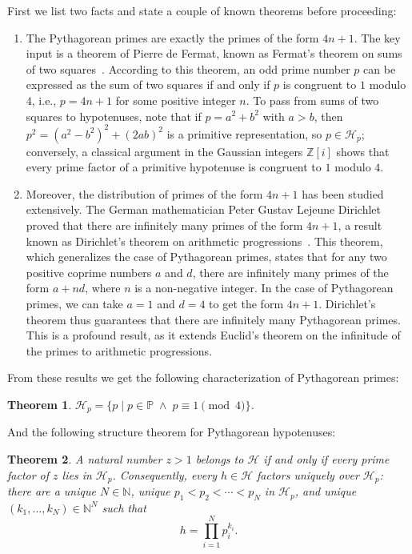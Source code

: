 \documentclass{article}
\theoremstyle{plain}
\newtheorem{theorem}{Theorem}
\theoremstyle{definition}
\theoremstyle{remark}
\begin{document}
First we list two facts and state a couple of known theorems before proceeding:
\begin{enumerate}
  \item The Pythagorean primes are exactly the primes of the form $4n + 1$.
      The key input is a theorem of Pierre de Fermat, known as
        Fermat's theorem on sums of two squares~\cite{hardy-wright}.
      According to this theorem, an odd prime number $p$ can be expressed as
        the sum of two squares if and only if
      $p$ is congruent to $1$ modulo $4$, i.e., $p = 4n + 1$ for some
        positive integer $n$.
      To pass from sums of two squares to hypotenuses, note that if
        $p = a^2 + b^2$ with $a > b$, then $p^2 = (a^2 - b^2)^2 + (2ab)^2$
        is a primitive representation, so $p \in \mathcal{H}_p$;
      conversely, a classical argument in the Gaussian integers
        $\mathbb{Z}[i]$ shows that every prime factor of a primitive
        hypotenuse is congruent to $1$ modulo $4$.
  \item Moreover, the distribution of primes of the form $4n + 1$ has
      been studied extensively.
      The German mathematician Peter Gustav Lejeune Dirichlet proved that
        there are infinitely many primes of the form $4n + 1$, a result known as
      Dirichlet's theorem on arithmetic progressions~\cite{davenport}.
      This theorem, which generalizes the case of Pythagorean primes, states
        that for any two positive coprime numbers $a$ and $d$,
      there are infinitely many primes of the form $a + nd$, where $n$ is a
        non-negative integer.
      In the case of Pythagorean primes, we can take $a = 1$ and $d = 4$ to
      get the form $4n + 1$.
        Dirichlet's theorem thus guarantees that there are infinitely
        many Pythagorean primes.
      This is a profound result, as it extends Euclid's theorem on the
      infinitude of the primes to arithmetic progressions.
\end{enumerate}
From these results we get the following characterization of Pythagorean primes:
\begin{theorem}\label{thm:hp-char}
$\mathcal{H}_p = \{ p \; | \; p \in \mathbb{P} \; \wedge \; p \equiv 1 \pmod{4}\}$.
\end{theorem}
And the following structure theorem for Pythagorean hypotenuses:
\begin{theorem}\label{thm:structure}
A natural number $z > 1$ belongs to $\mathcal{H}$ if and only if every prime
factor of $z$ lies in $\mathcal{H}_p$. Consequently, every $h \in \mathcal{H}$
factors uniquely over $\mathcal{H}_p$: there are a unique $N \in \mathbb{N}$,
unique $p_1 < p_2 < \cdots < p_N$ in $\mathcal{H}_p$, and unique
$(k_1, \ldots, k_N) \in \mathbb{N}^N$ such that
\begin{equation}
  h = \prod_{i=1}^N p_{i}^{k_i}.
\end{equation}
\end{theorem}
\end{document}
